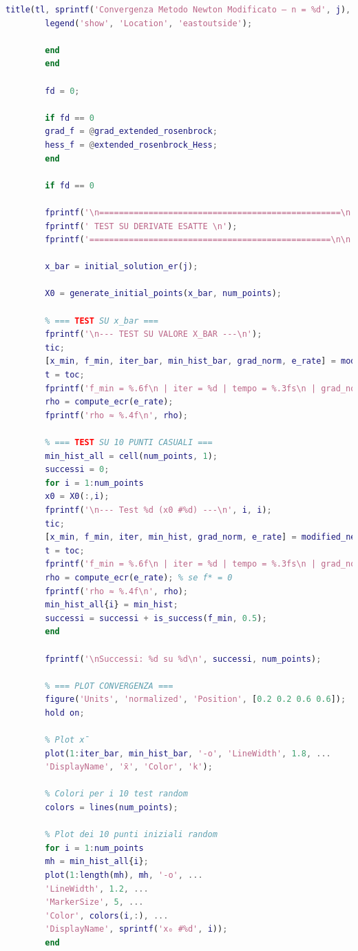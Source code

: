 \documentclass[a4paper,12pt]{article}
\begin{document}
\begin{lstlisting}[language=Matlab,caption={Full script: Modified Newton method on Extended Rosenbrock},label={lst:rosenbrock-extended}]
		title(tl, sprintf('Convergenza Metodo Newton Modificato – n = %d', j), 'FontSize', 14);
		legend('show', 'Location', 'eastoutside');
		
		end
		end
		
		fd = 0;
		
		if fd == 0
		grad_f = @grad_extended_rosenbrock;
		hess_f = @extended_rosenbrock_Hess;
		end
		
		if fd == 0
		
		fprintf('\n=================================================\n');
		fprintf(' TEST SU DERIVATE ESATTE \n');
		fprintf('=================================================\n\n');
		
		x_bar = initial_solution_er(j);
		
		X0 = generate_initial_points(x_bar, num_points);
		
		% === TEST SU x_bar ===
		fprintf('\n--- TEST SU VALORE X_BAR ---\n');
		tic;
		[x_min, f_min, iter_bar, min_hist_bar, grad_norm, e_rate] = modified_newton(extended_rosenbrock,grad_f,hess_f,x_bar,tol,max_iter,fd,[],[]);
		t = toc;
		fprintf('f_min = %.6f\n | iter = %d | tempo = %.3fs\n | grad_norm = %.6f\n', f_min, iter_bar, t, grad_norm);
		rho = compute_ecr(e_rate); 
		fprintf('rho ≈ %.4f\n', rho);
		
		% === TEST SU 10 PUNTI CASUALI ===
		min_hist_all = cell(num_points, 1);
		successi = 0;
		for i = 1:num_points
		x0 = X0(:,i);
		fprintf('\n--- Test %d (x0 #%d) ---\n', i, i);
		tic;
		[x_min, f_min, iter, min_hist, grad_norm, e_rate] = modified_newton(extended_rosenbrock,grad_f,hess_f,x0,tol,max_iter,fd,[],[]);
		t = toc;
		fprintf('f_min = %.6f\n | iter = %d | tempo = %.3fs\n | grad_norm = %.6f\n', f_min, iter, t, grad_norm);
		rho = compute_ecr(e_rate); % se f* = 0
		fprintf('rho ≈ %.4f\n', rho);
		min_hist_all{i} = min_hist;
		successi = successi + is_success(f_min, 0.5);
		end
		
		fprintf('\nSuccessi: %d su %d\n', successi, num_points);
		
		% === PLOT CONVERGENZA ===
		figure('Units', 'normalized', 'Position', [0.2 0.2 0.6 0.6]);  
		hold on;
		
		% Plot x̄
		plot(1:iter_bar, min_hist_bar, '-o', 'LineWidth', 1.8, ...
		'DisplayName', 'x̄', 'Color', 'k');
		
		% Colori per i 10 test random
		colors = lines(num_points);
		
		% Plot dei 10 punti iniziali random
		for i = 1:num_points
		mh = min_hist_all{i};
		plot(1:length(mh), mh, '-o', ...
		'LineWidth', 1.2, ...
		'MarkerSize', 5, ...
		'Color', colors(i,:), ...
		'DisplayName', sprintf('x₀ #%d', i));
		end
		

\end{lstlisting}
\end{document}
